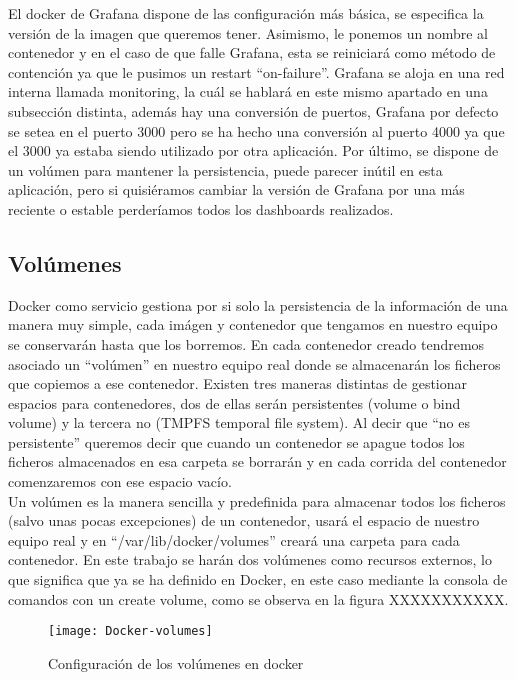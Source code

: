 \documentclass[ spanish, a4paper, 12pt, oneside]{report}
\begin{document}
El docker de Grafana dispone de las configuración más básica, se especifica la versión de la imagen que queremos tener. Asimismo, le ponemos un nombre al contenedor y en el caso de que falle Grafana, esta se reiniciará como método de contención ya que le pusimos un restart ``on-failure''.
Grafana se aloja en una red interna llamada monitoring, la cuál se hablará en este mismo apartado en una subsección distinta, además hay una conversión de puertos, Grafana por defecto se setea en el puerto 3000 pero se ha hecho una conversión al puerto 4000 ya que el 3000 ya estaba siendo 
utilizado por otra aplicación. Por último, se dispone de un volúmen para mantener la persistencia, puede parecer inútil en esta aplicación, pero si quisiéramos cambiar la versión de Grafana por una más reciente o estable perderíamos todos los dashboards realizados. \\
\subsection{Volúmenes}

Docker como servicio gestiona por si solo la persistencia de la información de una manera muy simple, cada imágen y contenedor que tengamos en nuestro equipo se conservarán hasta que los borremos. En cada contenedor creado tendremos asociado un ``volúmen'' en nuestro equipo real donde se almacenarán 
los ficheros que copiemos a ese contenedor. Existen tres maneras distintas de gestionar espacios para contenedores, dos de ellas serán persistentes (volume o bind volume) y la tercera no (TMPFS temporal file system). Al decir que ``no es persistente'' queremos decir que cuando un contenedor se apague todos los 
ficheros almacenados en esa carpeta se borrarán y en cada corrida del contenedor comenzaremos con ese espacio vacío. \\

Un volúmen es la manera sencilla y predefinida para almacenar todos los ficheros (salvo unas pocas excepciones) de un contenedor, usará el espacio de nuestro equipo real y en ``/var/lib/docker/volumes'' creará una carpeta para cada contenedor. En este trabajo se harán dos volúmenes como recursos externos, 
lo que significa que ya se ha definido en Docker, en este caso mediante la consola de comandos con un create volume, como se observa en la figura XXXXXXXXXXX.\\

\begin{figure}[!h]
   \centering
   \texttt{[image: Docker-volumes]}\\
      \caption{\label{fig: Configuración de los volúmenes en docker} Configuración de los volúmenes en docker}
\end{figure}
\end{document}
